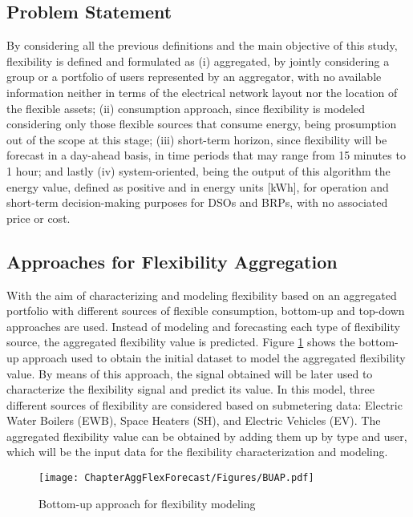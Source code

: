 \subsection{Problem Statement} \label{sec:problemstatement}
By considering all the previous definitions and the main objective of this study, flexibility is defined and formulated as (i) aggregated, by jointly considering a group or a portfolio of users represented by an aggregator, with no available information neither in terms of the electrical network layout nor the location of the flexible assets; (ii) consumption approach, since flexibility is modeled considering only those flexible sources that consume energy, being prosumption out of the scope at this stage; (iii) short-term horizon, since flexibility will be forecast in a day-ahead basis, in time periods that may range from 15 minutes to 1 hour; and lastly (iv) system-oriented, being the output of this algorithm the energy value, defined as positive and in energy units [kWh], for operation and short-term decision-making purposes for DSOs and BRPs, with no associated price or cost. 

\subsection{Approaches for Flexibility Aggregation}
With the aim of characterizing and modeling flexibility based on an aggregated portfolio with different sources of flexible consumption, bottom-up and top-down approaches are used. Instead of modeling and forecasting each type of flexibility source, the aggregated flexibility value is predicted. Figure \ref{fig:bottom_up} shows the bottom-up approach used to obtain the initial dataset to model the aggregated flexibility value. By means of this approach, the signal obtained will be later used to characterize the flexibility signal and predict its value. In this model, three different sources of flexibility are considered based on submetering data: Electric Water Boilers (EWB), Space Heaters (SH), and Electric Vehicles (EV). The aggregated flexibility value can be obtained by adding them up by type and user, which will be the input data for the flexibility characterization and modeling.

\begin{figure}[htbp]
\centerline{\texttt{[image: ChapterAggFlexForecast/Figures/BUAP.pdf]}}
\caption{Bottom-up approach for flexibility modeling}
\label{fig:bottom_up}
\end{figure}

